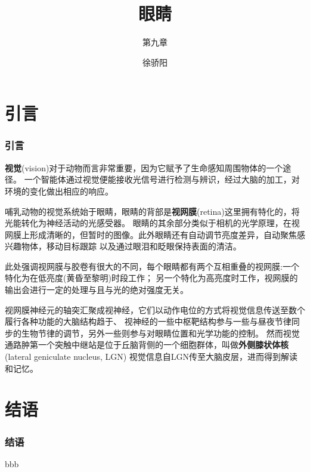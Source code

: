 \documentclass[UTF8]{ctexbeamer}
\title[眼睛] %
{眼睛}
\subtitle{第九章}
\author[]{徐骄阳} %
\institute[系统科学学院]{系统科学学院} %
\date[\today]{} %
\begin{document}
\frame{\titlepage}
\section*{引言}
\begin{frame}
    \frametitle{引言}

    \textbf{视觉}(vision)对于动物而言非常重要，因为它赋予了生命感知周围物体的一个途径。
    一个智能体通过视觉便能接收光信号进行检测与辨识，经过大脑的加工，对环境的变化做出相应的响应。

    哺乳动物的视觉系统始于眼睛，眼睛的背部是\textbf{视网膜}(retina)这里拥有特化的，将光能转化为神经活动的光感受器。
    眼睛的其余部分类似于相机的光学原理，在视网膜上形成清晰的，但暂时的图像。此外眼睛还有自动调节亮度差异，自动聚焦感兴趣物体，移动目标跟踪
    以及通过眼泪和眨眼保持表面的清洁。
    
    此处强调视网膜与胶卷有很大的不同，每个眼睛都有两个互相重叠的视网膜:一个特化为在低亮度(黄昏至黎明)时段工作；
    另一个特化为高亮度时工作，视网膜的输出会进行一定的处理与且与光的绝对强度无关。

    视网膜神经元的轴突汇聚成视神经，它们以动作电位的方式将视觉信息传送至数个履行各种功能的大脑结构趋于、
    视神经的一些中枢靶结构参与一些与昼夜节律同步的生物节律的调节，另外一些则参与对眼睛位置和光学功能的控制。
    然而视觉通路肿第一个突触中继站是位于丘脑背侧的一个细胞群体，叫做\textbf{外侧膝状体核}(lateral geniculate nucleus, LGN)
    视觉信息自LGN传至大脑皮层，进而得到解读和记忆。
\end{frame}








\section*{结语}
\begin{frame}
    \frametitle{结语}

    bbb

\end{frame}
\end{document}
